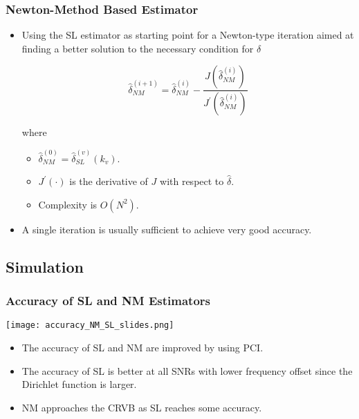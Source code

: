 \begin{frame}
  \frametitle{Newton-Method Based Estimator}

    \begin{itemize}
    
      \item Using the SL estimator as starting point for a Newton-type iteration aimed at finding a better solution to the necessary condition for $\hat{\delta}$
      
      \begin{equation*}
        \label{eq:iter_NM_est}
        \hat{\delta}_{NM}^{(i+1)}=\hat{\delta}_{NM}^{(i)}-
        \frac{J(\hat{\delta}_{NM}^{(i)})}{J^\prime(\hat{\delta}_{NM}^{(i)})}
      \end{equation*}

      where
      \begin{itemize}
        \item $\hat{\delta}_{NM}^{(0)}=\hat{\delta}^{(v)}_{SL}(k_v)$.
        \item $J^\prime(\cdot)$ is the derivative of $J$ with respect to $\hat{\delta}$.
        \item Complexity is $O(N^2)$.
      \end{itemize}

      \item A single iteration is usually sufficient to achieve very good accuracy.
        

    \end{itemize}




\end{frame}

\subsection{Simulation}

\begin{frame}
  \frametitle{Accuracy of SL and NM Estimators}

    \begin{center}
      \texttt{[image: accuracy\_NM\_SL\_slides.png]}
    \end{center}

    \begin{itemize}
    
      \item The accuracy of SL and NM are improved by using PCI.
      \item The accuracy of SL is better at all SNRs with lower frequency offset since the Dirichlet function is larger.  
      \item NM approaches the CRVB as SL reaches some accuracy.

    \end{itemize}




\end{frame}

